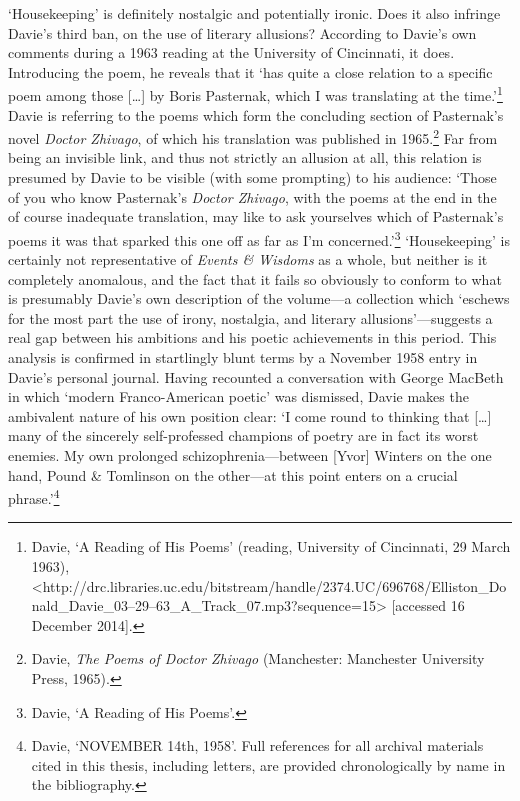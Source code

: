 \documentclass[]{article}
\begin{document}
`Housekeeping' is definitely nostalgic and potentially ironic. Does it
also infringe Davie's third ban, on the use of literary allusions?
According to Davie's own comments during a 1963 reading at the
University of Cincinnati, it does. Introducing the poem, he reveals that
it `has quite a close relation to a specific poem among those
{[}\ldots{}{]} by Boris Pasternak, which I was translating at the
time.'\footnote{Davie, `A Reading of His Poems' (reading, University of
  Cincinnati, 29 March 1963),
  \textless{}http://drc.libraries.uc.edu/bitstream/handle/2374.UC/696768/Elliston\_Donald\_Davie\_03--29--63\_A\_Track\_07.mp3?sequence=15\textgreater{}
  {[}accessed 16 December 2014{]}.} Davie is referring to the poems
which form the concluding section of Pasternak's novel \emph{Doctor
Zhivago}, of which his translation was published in 1965.\footnote{Davie,
  \emph{The Poems of Doctor Zhivago} (Manchester: Manchester University
  Press, 1965).} Far from being an invisible link, and thus not strictly
an allusion at all, this relation is presumed by Davie to be visible
(with some prompting) to his audience: `Those of you who know
Pasternak's \emph{Doctor Zhivago}, with the poems at the end in the of
course inadequate translation, may like to ask yourselves which of
Pasternak's poems it was that sparked this one off as far as I'm
concerned.'\footnote{Davie, `A Reading of His Poems'.} `Housekeeping' is
certainly not representative of \emph{Events \& Wisdoms} as a whole, but
neither is it completely anomalous, and the fact that it fails so
obviously to conform to what is presumably Davie's own description of
the volume---a collection which `eschews for the most part the use of
irony, nostalgia, and literary allusions'---suggests a real gap between
his ambitions and his poetic achievements in this period. This analysis
is confirmed in startlingly blunt terms by a November 1958 entry in
Davie's personal journal. Having recounted a conversation with George
MacBeth in which `modern Franco-American poetic' was dismissed, Davie
makes the ambivalent nature of his own position clear: `I come round to
thinking that {[}\ldots{}{]} many of the sincerely self-professed
champions of poetry are in fact its worst enemies. My own prolonged
schizophrenia---between {[}Yvor{]} Winters on the one hand, Pound \&
Tomlinson on the other---at this point enters on a crucial
phrase.'\footnote{Davie, `NOVEMBER 14th, 1958'. Full references for all
  archival materials cited in this thesis, including letters, are
  provided chronologically by name in the bibliography.}
\end{document}
